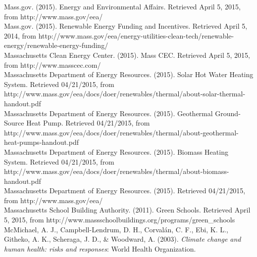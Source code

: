 \hangindent=0.5in
Mass.gov. (2015). Energy and Environmental Affairs. Retrieved April 5, 2015, from http:\slash \slash www.mass.gov\slash eea\slash  \\

\hangindent=0.5in
Mass.gov. (2015). Renewable Energy Funding and Incentives. Retrieved April 5, 2014, from http:\slash \slash www.mass.gov\slash eea\slash energy-utilities-clean-tech\slash renewable-energy\slash renewable-energy-funding\slash  \\

\hangindent=0.5in
Massachusetts Clean Energy Center. (2015). Mass CEC. Retrieved April 5, 2015, from http:\slash \slash www.masscec.com\slash  \\

\hangindent=0.5in
Massachusetts Department of Energy Resources. (2015). Solar Hot Water Heating System. Retrieved 04\slash 21\slash 2015, from http:\slash \slash www.mass.gov\slash eea\slash docs\slash doer\slash renewables\slash thermal\slash about-solar-thermal-handout.pdf \\

\hangindent=0.5in
Massachusetts Department of Energy Resources. (2015). Geothermal Ground-Source Heat Pump. Retrieved 04\slash 21\slash 2015, from http:\slash \slash www.mass.gov\slash eea\slash docs\slash doer\slash renewables\slash thermal\slash about-geothermal-heat-pumps-handout.pdf \\

\hangindent=0.5in
Massachusetts Department of Energy Resources. (2015). Biomass Heating System. Retrieved 04\slash 21\slash 2015, from http:\slash \slash www.mass.gov\slash eea\slash docs\slash doer\slash renewables\slash thermal\slash about-biomass-handout.pdf \\

\hangindent=0.5in
Massachusetts Department of Energy Resources. (2015). Retrieved 04\slash 21\slash 2015, from http:\slash \slash www.mass.gov\slash eea\slash  \\

\hangindent=0.5in
Massachusetts School Building Authority. (2011). Green Schools. Retrieved April 5, 2015, from http:\slash \slash www.massschoolbuildings.org\slash programs\slash green\_schools \\

\hangindent=0.5in
McMichael, A. J., Campbell-Lendrum, D. H., Corvalán, C. F., Ebi, K. L., Githeko, A. K., Scheraga, J. D., \& Woodward, A. (2003). \emph{Climate change and human health: risks and responses}: World Health Organization. \\

